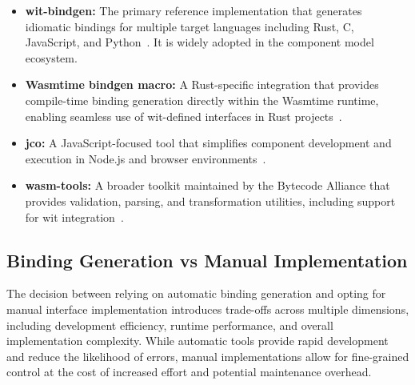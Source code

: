 \begin{itemize}
    \item \textbf{wit-bindgen:} The primary reference implementation that generates idiomatic bindings for multiple target languages including Rust, C, JavaScript, and Python~\cite{wit_bindgen_git}. It is widely adopted in the component model ecosystem.
    \item \textbf{Wasmtime bindgen macro:} A Rust-specific integration that provides compile-time binding generation directly within the Wasmtime runtime, enabling seamless use of \acrshort{wit}-defined interfaces in Rust projects~\cite{wasmtime_bindgen_docs}.
    \item \textbf{jco:} A JavaScript-focused tool that simplifies component development and execution in Node.js and browser environments~\cite{jco_docs}.
    \item \textbf{wasm-tools:} A broader toolkit maintained by the Bytecode Alliance that provides validation, parsing, and transformation utilities, including support for \acrshort{wit} integration~\cite{wasm_tools_git}.
\end{itemize}

\subsection{Binding Generation vs Manual Implementation}
\label{subsec:binding-comparison}

The decision between relying on automatic binding generation and opting for manual interface implementation introduces trade-offs across multiple dimensions, including development efficiency, runtime performance, and overall implementation complexity. While automatic tools provide rapid development and reduce the likelihood of errors, manual implementations allow for fine-grained control at the cost of increased effort and potential maintenance overhead.

